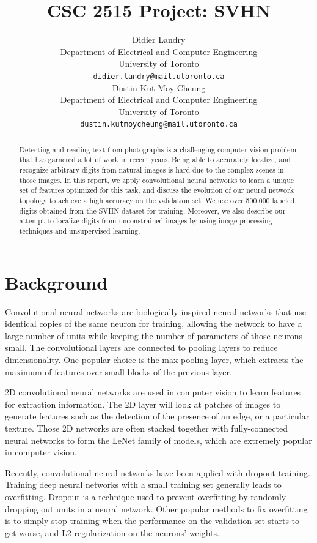 \documentclass{article} %
\title{CSC 2515 Project: SVHN}
\author{
Didier Landry\\
Department of Electrical and Computer Engineering\\
University of Toronto\\
\texttt{didier.landry@mail.utoronto.ca} \\
\And
Dustin Kut Moy Cheung\\
Department of Electrical and Computer Engineering\\
University of Toronto\\
\texttt{dustin.kutmoycheung@mail.utoronto.ca} \\
}
\begin{document}
\maketitle

\begin{abstract}
Detecting and reading text from photographs is a challenging computer vision problem that has garnered a lot of work in recent years. Being able to accurately localize, and recognize arbitrary digits from natural images is hard due to the complex scenes in those images. In this report, we apply convolutional neural networks to learn a unique set of features optimized for this task, and discuss the evolution of our neural network topology to achieve a high accuracy on the validation set. We use over 500,000 labeled digits obtained from the SVHN\cite{svhn} dataset for training. Moreover, we also describe our attempt to localize digits from unconstrained images by using image processing techniques and unsupervised learning.
\end{abstract}

\section{Background}
Convolutional neural networks\cite{lecun_convolutional_svhn} are biologically-inspired neural networks that use identical copies of the same neuron for training, allowing the network to have a large number of units while keeping the number of parameters of those neurons small. The convolutional layers are connected to pooling layers to reduce dimensionality. One popular choice is the max-pooling layer, which extracts the maximum of features over small blocks of the previous layer.

2D convolutional neural networks are used in computer vision to learn features for extraction information. The 2D layer will look at patches of images to generate features such as the detection of the presence of an edge, or a particular texture. Those 2D networks are often stacked together with fully-connected neural networks to form the LeNet family of models, which are extremely popular in computer vision.

Recently, convolutional neural networks have been applied with dropout training\cite{dropout}. Training deep neural networks with a small training set generally leads to overfitting. Dropout is a technique used to prevent overfitting by randomly dropping out units in a neural network. Other popular methods to fix overfitting is to simply stop training when the performance on the validation set starts to get worse, and L2 regularization on the neurons' weights.
\end{document}
